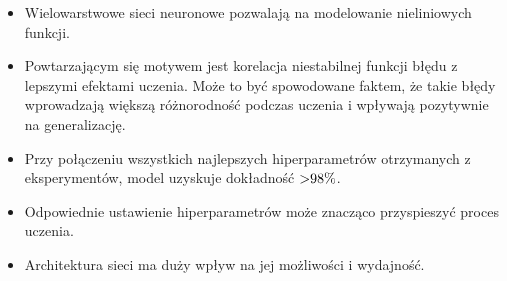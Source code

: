 \documentclass{article}
\begin{document}
\begin{itemize}
	\item Wielowarstwowe sieci neuronowe pozwalają na modelowanie nieliniowych funkcji.
	\item Powtarzającym się motywem jest korelacja niestabilnej funkcji błędu z lepszymi efektami uczenia. Może to być spowodowane faktem, że takie błędy wprowadzają większą różnorodność podczas uczenia i wpływają pozytywnie na generalizację.
	\item Przy połączeniu wszystkich najlepszych hiperparametrów otrzymanych z eksperymentów, model uzyskuje dokładność \($>98\%$\).
	\item Odpowiednie ustawienie hiperparametrów może znacząco przyspieszyć proces uczenia.
	\item Architektura sieci ma duży wpływ na jej możliwości i wydajność.
\end{itemize}
\end{document}
